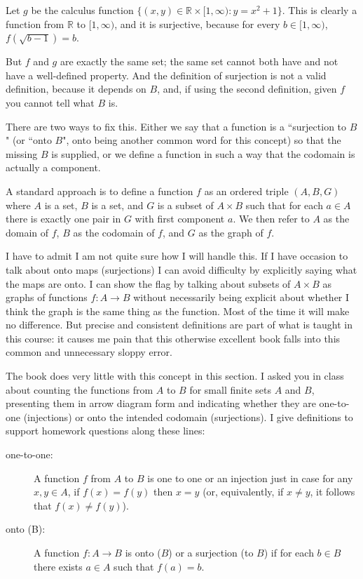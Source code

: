 \documentclass[12pt]{article}
\begin{document}
Let $g$ be the calculus function $\{(x,y) \in {\mathbb R} \times [1,\infty):y=x^2+1\}$.  This is clearly a function from
$\mathbb R$ to $[1,\infty)$, and it is surjective, because for every $b\in [1,\infty)$, $f(\sqrt{b-1}) = b$.

But $f$ and $g$ are exactly the same set;  the same set cannot both have and not have a well-defined property.  And the definition of surjection is not a valid definition, because it depends on $B$, and, if using the second definition, given $f$ you cannot tell what $B$ is.

There are two ways to fix this.  Either we say that a function is a ``surjection to $B$" (or ``onto $B$", onto being another common word for this concept) so that the missing $B$ is supplied, or we define a function in such a way that the codomain is actually a component.  

A standard approach is to define a function $f$ as an ordered triple $(A,B,G)$ where $A$ is a set, $B$ is a set, and $G$ is a subset of $A \times B$ such that for each $a \in A$ there is exactly one pair in $G$ with first component $a$.  We then refer to $A$ as the domain of $f$, $B$ as the codomain of $f$, and $G$ as the graph of $f$.

I have to admit I am not quite sure how I will handle this.  If I have occasion to talk about onto maps (surjections) I can avoid difficulty by explicitly saying what the maps are onto.  I can show the flag by talking about subsets of $A \times B$ as graphs of functions $f: A \rightarrow B$ without necessarily being explicit about whether I think the graph is the same thing as the function.  Most of the time it will make no difference.  But precise and consistent definitions are part of what is taught in this course:  it causes me pain that this otherwise excellent book falls into this common and unnecessary sloppy error.

The book does very little with this concept in this section.  I asked you in class about counting the functions from $A$ to $B$ for small
finite sets $A$ and $B$, presenting them in arrow diagram form and indicating whether they are one-to-one (injections) or onto the intended codomain (surjections).  I give definitions to support homework questions along these lines:

\begin{description}

\item [one-to-one:] A function $f$ from $A$ to $B$ is one to one or an injection just in case for any $x,y \in A$, if $f(x)=f(y)$ then $x=y$ (or, equivalently, if $x \neq y$, it follows that $f(x) \neq f(y)$).

\item[onto (B):]  A function $f:A \rightarrow B$ is onto ($B$) or a surjection (to $B$) if for each $b \in B$ there exists $a \in A$ such that $f(a)=b$.

\end{description}
\end{document}
